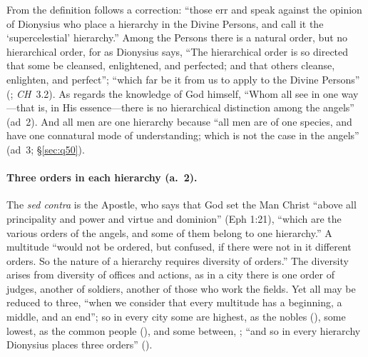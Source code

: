 From the definition follows a correction: ``those err and speak against the
opinion of Dionysius who place a hierarchy in the Divine Persons, and call it
the `supercelestial' hierarchy.'' Among the Persons there is a natural
order, but no hierarchical order, for as Dionysius says, ``The hierarchical
order is so directed that some be cleansed, enlightened, and perfected; and
that others cleanse, enlighten, and perfect''; ``which far be it from us to
apply to the Divine Persons'' (; \emph{CH}~3.2). As
regards the knowledge of God himself, ``Whom all see in one way---that is,
in His essence---there is no hierarchical distinction among the angels''
(ad~2). And all men are one hierarchy because ``all men are of one species,
and have one connatural mode of understanding; which is not the case in the
angels'' (ad~3; \S\ref{sec:q50}).

\paragraph{Three orders in each hierarchy (a.~2).} The \emph{sed contra} is
the Apostle, who says that God set the Man Christ ``above all principality
and power and virtue and dominion'' (Eph 1:21), ``which are the various
orders of the angels, and some of them belong to one hierarchy.'' A
multitude ``would not be ordered, but confused, if there were not in it
different orders. So the nature of a hierarchy requires diversity of
orders.'' The diversity arises from diversity of offices and actions, as in a
city there is one order of judges, another of soldiers, another of those who
work the fields. Yet all may be reduced to three, ``when we consider that
every multitude has a beginning, a middle, and an end''; so in every city
some are highest, as the nobles (), some lowest, as the
common people (), and some between, ; ``and so in every hierarchy Dionysius places three orders''
().

